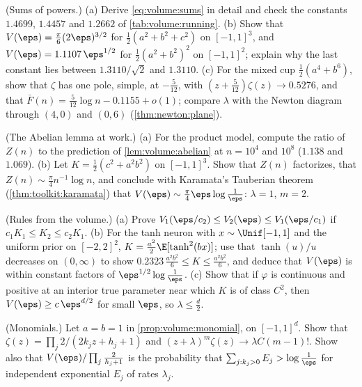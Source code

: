 \begin{refsection}
\begin{exercises}
\item \consolidation (Sums of powers.) (a) Derive \eqref{eq:volume:sums} in detail and check the constants $1.4699$, $1.4457$ and $1.2662$ of \cref{tab:volume:running}. (b) Show that $V(\eps)=\frac\pi6(2\eps)^{3/2}$ for $\frac12(a^2+b^2+c^2)$ on $[-1,1]^3$, and $V(\eps)=1.1107\,\eps^{1/2}$ for $\frac12(a^2+b^2)^2$ on $[-1,1]^2$; explain why the last constant lies between $1.3110/\sqrt2$ and $1.3110$. (c) For the mixed cup $\frac12(a^4+b^6)$, show that $\zeta$ has one pole, simple, at $-\frac5{12}$, with $(z+\frac5{12})\zeta(z)\to0.5276$, and that $\bar F(n)=\frac5{12}\log n-0.1155+o(1)$; compare $\lambda$ with the Newton diagram through $(4,0)$ and $(0,6)$ (\cref{thm:newton:plane}).\label{ex:volume:sums}

\item \consolidation (The Abelian lemma at work.) (a) For the product model, compute the ratio of $Z(n)$ to the prediction of \cref{lem:volume:abelian} at $n=10^4$ and $10^8$ ($1.138$ and $1.069$). (b) Let $K=\frac12(c^2+a^2b^2)$ on $[-1,1]^3$. Show that $Z(n)$ factorizes, that $Z(n)\sim\frac\pi4n^{-1}\log n$, and conclude with Karamata's Tauberian theorem (\cref{thm:toolkit:karamata}) that $V(\eps)\sim\frac\pi4\eps\log\frac1\eps$: $\lambda=1$, $m=2$.\label{ex:volume:abelian}

\item \consolidation (Rules from the volume.) (a) Prove $V_1(\eps/c_2)\le V_2(\eps)\le V_1(\eps/c_1)$ if $c_1K_1\le K_2\le c_2K_1$. (b) For the tanh neuron with $x\sim\Unif[-1,1]$ and the uniform prior on $[-2,2]^2$, $K=\frac{a^2}2\E[\tanh^2(bx)]$; use that $\tanh(u)/u$ decreases on $(0,\infty)$ to show $0.2323\,\frac{a^2b^2}6\le K\le\frac{a^2b^2}6$, and deduce that $V(\eps)$ is within constant factors of $\eps^{1/2}\log\frac1\eps$. (c) Show that if $\varphi$ is continuous and positive at an interior true parameter near which $K$ is of class $C^2$, then $V(\eps)\ge c\,\eps^{d/2}$ for small $\eps$, so $\lambda\le\frac d2$.\label{ex:volume:rules}

\item \consolidation (Monomials.) Let $a=b=1$ in \cref{prop:volume:monomial}, on $[-1,1]^d$. Show that $\zeta(z)=\prod_j2/(2k_jz+h_j+1)$ and $(z+\lambda)^m\zeta(z)\to\lambda C(m-1)!$. Show also that $V(\eps)/\prod_j\frac2{h_j+1}$ is the probability that $\sum_{j:k_j>0}E_j>\log\frac1\eps$ for independent exponential $E_j$ of rates $\lambda_j$.\label{ex:volume:zetamono}


\end{exercises}
\end{refsection}
